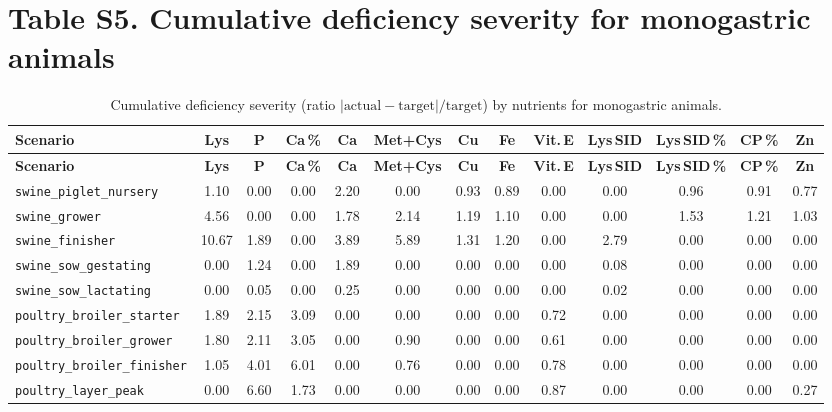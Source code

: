\documentclass[11pt]{article}
\begin{document}
\section*{Table S5. Cumulative deficiency severity for monogastric animals}
{\footnotesize
\begin{longtable}{lcccccccccccc}
\caption{Cumulative deficiency severity (ratio $|\text{actual} - \text{target}| / \text{target}$) by nutrients for monogastric animals.}\label{tab:s5_heatmap} \\
\toprule
\textbf{Scenario} & \textbf{Lys} & \textbf{P} & \textbf{Ca\,\%} & \textbf{Ca} & \textbf{Met+Cys} & \textbf{Cu} & \textbf{Fe} & \textbf{Vit.\,E} & \textbf{Lys\,SID} & \textbf{Lys\,SID\,\%} & \textbf{CP\,\%} & \textbf{Zn} \\
\midrule
\endfirsthead
\toprule
\textbf{Scenario} & \textbf{Lys} & \textbf{P} & \textbf{Ca\,\%} & \textbf{Ca} & \textbf{Met+Cys} & \textbf{Cu} & \textbf{Fe} & \textbf{Vit.\,E} & \textbf{Lys\,SID} & \textbf{Lys\,SID\,\%} & \textbf{CP\,\%} & \textbf{Zn} \\
\midrule
\endhead
\bottomrule
\endfoot
\bottomrule
\endlastfoot
\texttt{swine\_piglet\_nursery} & 1.10 & 0.00 & 0.00 & 2.20 & 0.00 & 0.93 & 0.89 & 0.00 & 0.00 & 0.96 & 0.91 & 0.77 \\
\texttt{swine\_grower} & 4.56 & 0.00 & 0.00 & 1.78 & 2.14 & 1.19 & 1.10 & 0.00 & 0.00 & 1.53 & 1.21 & 1.03 \\
\texttt{swine\_finisher} & 10.67 & 1.89 & 0.00 & 3.89 & 5.89 & 1.31 & 1.20 & 0.00 & 2.79 & 0.00 & 0.00 & 0.00 \\
\texttt{swine\_sow\_gestating} & 0.00 & 1.24 & 0.00 & 1.89 & 0.00 & 0.00 & 0.00 & 0.00 & 0.08 & 0.00 & 0.00 & 0.00 \\
\texttt{swine\_sow\_lactating} & 0.00 & 0.05 & 0.00 & 0.25 & 0.00 & 0.00 & 0.00 & 0.00 & 0.02 & 0.00 & 0.00 & 0.00 \\
\texttt{poultry\_broiler\_starter} & 1.89 & 2.15 & 3.09 & 0.00 & 0.00 & 0.00 & 0.00 & 0.72 & 0.00 & 0.00 & 0.00 & 0.00 \\
\texttt{poultry\_broiler\_grower} & 1.80 & 2.11 & 3.05 & 0.00 & 0.90 & 0.00 & 0.00 & 0.61 & 0.00 & 0.00 & 0.00 & 0.00 \\
\texttt{poultry\_broiler\_finisher} & 1.05 & 4.01 & 6.01 & 0.00 & 0.76 & 0.00 & 0.00 & 0.78 & 0.00 & 0.00 & 0.00 & 0.00 \\
\texttt{poultry\_layer\_peak} & 0.00 & 6.60 & 1.73 & 0.00 & 0.00 & 0.00 & 0.00 & 0.87 & 0.00 & 0.00 & 0.00 & 0.27 \\
\end{longtable}
}
\end{document}
